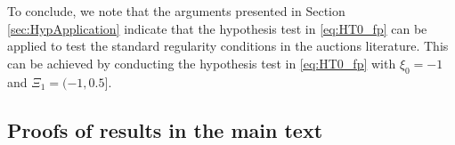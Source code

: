To conclude, we note that the arguments presented in Section \ref{sec:HypApplication} indicate that the hypothesis test in \eqref{eq:HT0_fp} can be applied to test the standard regularity conditions in the auctions literature. This can be achieved by conducting the hypothesis test in \eqref{eq:HT0_fp} with $\xi _{0}=-1$ and $\Xi _{1} = (-1,0.5]$.





\subsection{Proofs of results in the main text}\label{sec:appendix-proof}


